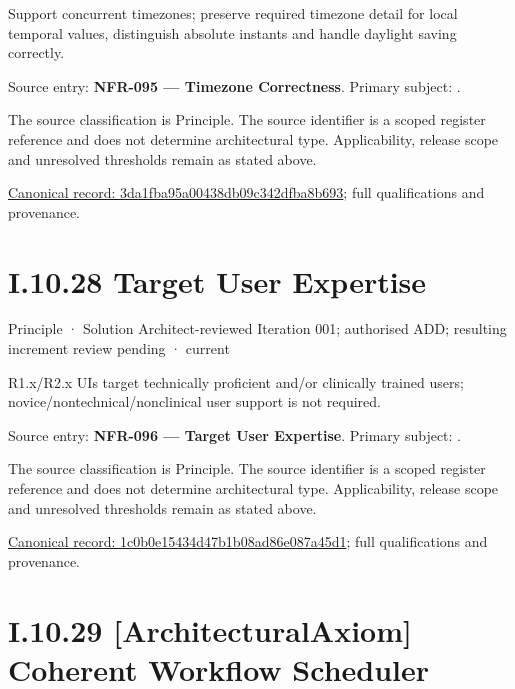 Support concurrent timezones; preserve required timezone detail for local temporal values, distinguish absolute instants and handle daylight saving correctly.



Source entry: \textbf{NFR-095 — Timezone Correctness}. Primary subject: \texttt{}.



The source classification is Principle. The source identifier is a scoped register reference and does not determine architectural type. Applicability, release scope and unresolved thresholds remain as stated above.


{\footnotesize \href{../../../../../../../continuum/motivation/principle/3da1fba95a00438db09c342dfba8b693.md}{Canonical record: 3da1fba95a00438db09c342dfba8b693}; full qualifications and provenance.}\par
\section*{I.10.28 Target User Expertise}
\label{navigation:I.10.28}

\label{element:1c0b0e15434d47b1b08ad86e087a45d1}
{\small Principle · Solution Architect-reviewed Iteration 001; authorised ADD; resulting increment review pending · current}\par

R1.x/R2.x UIs target technically proficient and/or clinically trained users; novice/nontechnical/nonclinical user support is not required.



Source entry: \textbf{NFR-096 — Target User Expertise}. Primary subject: \texttt{}.



The source classification is Principle. The source identifier is a scoped register reference and does not determine architectural type. Applicability, release scope and unresolved thresholds remain as stated above.


{\footnotesize \href{../../../../../../../continuum/motivation/principle/1c0b0e15434d47b1b08ad86e087a45d1.md}{Canonical record: 1c0b0e15434d47b1b08ad86e087a45d1}; full qualifications and provenance.}\par
\section*{I.10.29 [ArchitecturalAxiom] Coherent Workflow Scheduler}
\label{navigation:I.10.29}

